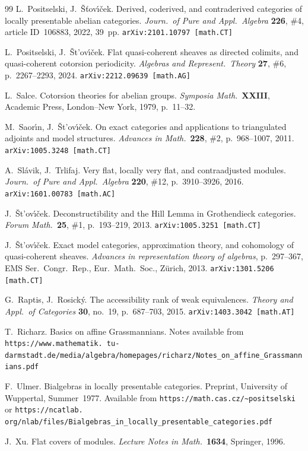 \documentclass[12pt,a4paper]{amsart}
\newcommand{\+}{\protect\nobreakdash-}
\renewcommand{\:}{\colon}
\theoremstyle{plain}
\theoremstyle{definition}
\begin{document}
\begin{thebibliography}{99}
 L.~Positselski, J.~\v S\v tov\'\i\v cek.
   Derived, coderived, and contraderived categories of locally
presentable abelian categories.
\textit{Journ.\ of Pure and Appl.\ Algebra} \textbf{226}, \#4,
article ID~106883, 2022, 39~pp.  \texttt{arXiv:2101.10797 [math.CT]}

 L.~Positselski, J.~\v St\!'ov\'\i\v cek.
   Flat quasi-coherent sheaves as directed colimits, and quasi-coherent
cotorsion periodicity.
\textit{Algebras and Represent.\ Theory} \textbf{27}, \#6,
p.~2267--2293, 2024.  \texttt{arXiv:2212.09639 [math.AG]}

 L.~Salce.
   Cotorsion theories for abelian groups.
\textit{Symposia Math.}\ \textbf{XXIII},
Academic Press, London--New York, 1979, p.~11--32.

 M.~Saor\'\i n, J.~\v St\!'ov\'\i\v cek.
   On exact categories and applications to triangulated adjoints
and model structures.
\textit{Advances in Math.}\ \textbf{228}, \#2, p.~968--1007, 2011.
\texttt{arXiv:1005.3248 [math.CT]}

 A.~Sl\'avik, J.~Trlifaj.
   Very flat, locally very flat, and contraadjusted modules.
\textit{Journ.\ of Pure and Appl.\ Algebra} \textbf{220}, \#12,
p.~3910--3926, 2016.  \texttt{arXiv:1601.00783 [math.AC]}

 J.~\v St\!'ov\'\i\v cek.
   Deconstructibility and the Hill Lemma in Grothendieck categories.
\textit{Forum Math.}\ \textbf{25}, \#1, p.~193--219, 2013.
\texttt{arXiv:1005.3251 [math.CT]}

 J.~\v St\!'ov\'\i\v cek.
   Exact model categories, approximation theory, and cohomology of
quasi-coherent sheaves.
\textit{Advances in representation theory of algebras}, p.~297--367,
EMS Ser.\ Congr.\ Rep., Eur.\ Math.\ Soc., Z\" urich, 2013.
\texttt{arXiv:1301.5206 [math.CT]}

 G.~Raptis, J.~Rosick\'y.
   The accessibility rank of weak equivalences.
\textit{Theory and Appl.\ of Categories} \textbf{30}, no.~19,
p.~687--703, 2015.  \texttt{arXiv:1403.3042 [math.AT]}

 T.~Richarz.
   Basics on affine Grassmannians.
Notes available from \texttt{https://www.mathematik.
tu-darmstadt.de/media/algebra/homepages/richarz/Notes\_on\_affine\_Grassmannians.pdf}
{\hfuzz=10pt\par}

 F.~Ulmer.
   Bialgebras in locally presentable categories.
Preprint, University of Wuppertal, Summer~1977.
Available from \texttt{https://math.cas.cz/\textasciitilde positselski}
or \texttt{https://ncatlab.
org/nlab/files/Bialgebras\_in\_locally\_presentable\_categories.pdf}

 J.~Xu.
   Flat covers of modules.
\textit{Lecture Notes in Math.}\ \textbf{1634}, Springer, 1996.

\end{thebibliography}
\end{document}
